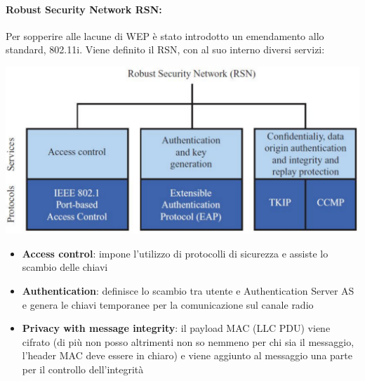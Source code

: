 \paragraph{Robust Security Network RSN:} Per sopperire alle lacune di WEP è stato introdotto un emendamento allo standard, 802.11i. Viene definito il RSN, con al suo interno diversi servizi:
\begin{center}
	\includegraphics[width=0.7\linewidth]{img/wlan/rns}
\end{center}
\begin{itemize}
	\item \textbf{Access control}: impone l'utilizzo di protocolli di sicurezza e assiste lo scambio delle chiavi
	\item \textbf{Authentication}: definisce lo scambio tra utente e Authentication Server AS e genera le chiavi temporanee per la comunicazione sul canale radio
	\item \textbf{Privacy with message integrity}: il payload MAC (LLC PDU) viene cifrato (di più non posso altrimenti non so nemmeno per chi sia il messaggio, l'header MAC deve essere in chiaro) e viene aggiunto al messaggio una parte per il controllo dell'integrità
\end{itemize}

